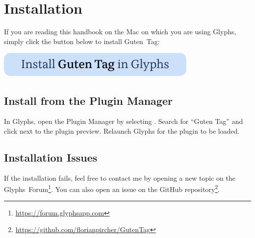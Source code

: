 \chapter{Installation}%
\label{installation}

If you are reading this handbook on the Mac on which you are using Glyphs, simply click the button below to install Guten~Tag:

\bigbreak\noindent%
\href{https://formkunft.com/glyphs/plugins/guten-tag/install}{%
  \includegraphics{Images/Install Guten Tag in Glyphs.pdf}}

\section{Install from the Plugin Manager}%
\label{installation:plugin-manager}

In Glyphs, open the Plugin Manager by selecting .
Search for \enquote{Guten Tag} and click  next to the plugin preview.
Relaunch Glyphs for the plugin to be loaded.

\bigbreak\noindent{}%

\section{Installation Issues}%
\label{installation:issues}

If the installation fails, feel free to contact me by opening a new topic on the Glyphs~Forum\footnote{\url{https://forum.glyphsapp.com}}.
You can also open an issue on the GitHub repository\footnote{\url{https://github.com/florianpircher/GutenTag}}.
